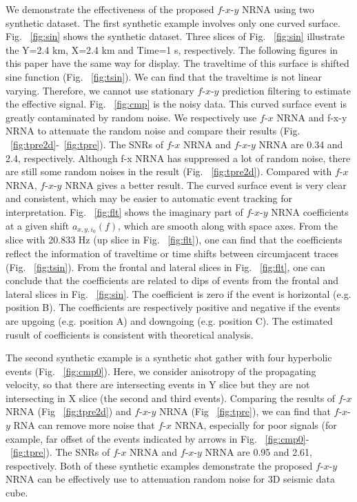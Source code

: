 We demonstrate the effectiveness of the proposed $f$-$x$-$y$ NRNA using two synthetic 
dataset. The first synthetic example involves only one curved surface. Fig. ~\ref{fig:sin} 
shows the synthetic dataset. Three slices of Fig. ~\ref{fig:sin} illustrate the Y=2.4 km, 
X=2.4 km and Time=1 s, respectively. The following figures in this paper have 
the same way for display. The traveltime of this surface is shifted sine 
function (Fig. ~\ref{fig:tsin}). We can find that the traveltime is not linear varying. 
Therefore, we cannot use stationary $f$-$x$-$y$ prediction filtering to estimate 
the effective signal. Fig. ~\ref{fig:cmp} is the noisy data. This curved surface event 
is greatly contaminated by random noise. We respectively use $f$-$x$ NRNA and 
f-x-y NRNA to attenuate the random noise and compare their results (Fig. ~\ref{fig:tpre2d}-~\ref{fig:tpre}). 
The SNRs of $f$-$x$ NRNA and $f$-$x$-$y$ NRNA are 0.34 and 2.4, respectively. Although 
f-x NRNA has suppressed a lot of random noise, there are still some random 
noises in the result (Fig. ~\ref{fig:tpre2d}). Compared with $f$-$x$ NRNA, $f$-$x$-$y$ NRNA gives a 
better result. The curved surface event is very clear and consistent, which 
may be easier to automatic event tracking for interpretation. Fig. ~\ref{fig:flt} shows 
the imaginary part of $f$-$x$-$y$ NRNA coefficients at a given shift ${{a}_{x,y,{{i}_{0}}}}(f)$, 
which are smooth along with space axes. From the slice with 20.833 Hz (up slice in Fig. ~\ref{fig:flt}), 
one can find that the coefficients reflect the information of traveltime or time shifts 
between circumjacent traces (Fig. ~\ref{fig:tsin}). From the frontal and lateral slices 
in Fig. ~\ref{fig:flt}, one can conclude that the coefficients are related to dips of 
events from the frontal and lateral slices in Fig. ~\ref{fig:sin}. The coefficient is 
zero if the event is horizontal (e.g. position B). The coefficients are 
respectively positive and negative if the events are upgoing (e.g. position A) 
and downgoing (e.g. position C). The estimated rusult of coefficients is 
consistent with theoretical analysis.



 
The second synthetic example is a synthetic shot gather with four hyperbolic 
events (Fig. ~\ref{fig:cmp0}). Here, we consider anisotropy of the propagating velocity, 
so that there are intersecting events in Y slice but they are not intersecting 
in X slice (the second and third events). Comparing the results of $f$-$x$ NRNA 
(Fig ~\ref{fig:tpre2d}) and $f$-$x$-$y$ NRNA (Fig ~\ref{fig:tpre}), we can find that $f$-$x$-$y$ RNA can remove more 
noise that $f$-$x$ NRNA, especially for poor signals (for example, far offset of 
the events indicated by arrows in Fig. ~\ref{fig:cmp0}-~\ref{fig:tpre}). The SNRs of $f$-$x$ NRNA and $f$-$x$-$y$ 
NRNA are 0.95 and 2.61, respectively. Both of these synthetic examples 
demonstrate the proposed $f$-$x$-$y$ NRNA can be effectively use to attenuation 
random noise for 3D seismic data cube.

